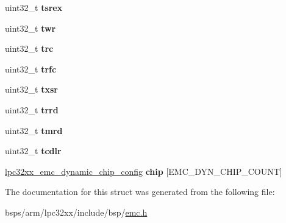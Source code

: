 \begin{DoxyCompactItemize}
uint32\+\_\+t {\bfseries tsrex}
\item 
\mbox{\label{structlpc32xx__emc__dynamic__config_a590dc16a9b73b392892bd1bf2b5c0321}} 
uint32\+\_\+t {\bfseries twr}
\item 
\mbox{\label{structlpc32xx__emc__dynamic__config_a8cc52b409e4982bed2bd3d5a582d222f}} 
uint32\+\_\+t {\bfseries trc}
\item 
\mbox{\label{structlpc32xx__emc__dynamic__config_a75c2ad4a5608bf7e882c7a2500546646}} 
uint32\+\_\+t {\bfseries trfc}
\item 
\mbox{\label{structlpc32xx__emc__dynamic__config_ab0227ad6b31e2f6d1d5b3fa7e941b109}} 
uint32\+\_\+t {\bfseries txsr}
\item 
\mbox{\label{structlpc32xx__emc__dynamic__config_ac45f9144c29b99992a1babdf30799c05}} 
uint32\+\_\+t {\bfseries trrd}
\item 
\mbox{\label{structlpc32xx__emc__dynamic__config_a2dff628f0000d7be96d73f85a0b9b371}} 
uint32\+\_\+t {\bfseries tmrd}
\item 
\mbox{\label{structlpc32xx__emc__dynamic__config_aea574beb0c562b5d5b6993d50aba11da}} 
uint32\+\_\+t {\bfseries tcdlr}
\item 
\mbox{\label{structlpc32xx__emc__dynamic__config_a50f2c54a7fa5ee209412fb0fae9db41f}} 
\mbox{\hyperlink{structlpc32xx__emc__dynamic__chip__config}{lpc32xx\+\_\+emc\+\_\+dynamic\+\_\+chip\+\_\+config}} {\bfseries chip} \mbox{[}E\+M\+C\+\_\+\+D\+Y\+N\+\_\+\+C\+H\+I\+P\+\_\+\+C\+O\+U\+NT\mbox{]}
\end{DoxyCompactItemize}


The documentation for this struct was generated from the following file\+:\begin{DoxyCompactItemize}
\item 
bsps/arm/lpc32xx/include/bsp/\mbox{\hyperlink{emc_8h}{emc.\+h}}\end{DoxyCompactItemize}
